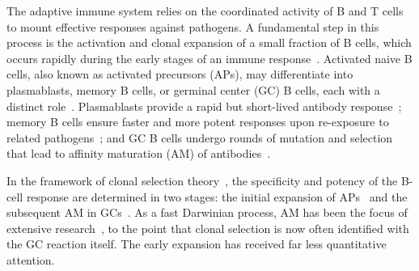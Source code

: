 \documentclass[aps, pre, twocolumn, 10pt, groupedaddress, superscriptaddress, linenumbers]{revtex4-2}
\begin{document}

\vspace{1cm}



{\Huge T}he adaptive immune system relies on the coordinated activity of B and T cells to mount effective responses against pathogens.
A fundamental step in this process is the activation and clonal expansion of a small fraction of B cells, which occurs rapidly during the early stages of an immune response~\cite{Lam_2019_Bcells}.
Activated naive B cells, also known as activated precursors (APs), may differentiate into plasmablasts, memory B cells, or germinal center (GC) B cells, each with a distinct role~\cite{pape_different_2011, Lam_2019_Bcells}.
Plasmablasts provide a rapid but short-lived antibody response~\cite{Lam_2019_Bcells}; memory B cells ensure faster and more potent responses upon re-exposure to related pathogens~\cite{Inoue_2024_Memory_review}; and GC B cells undergo rounds of mutation and selection that lead to affinity maturation (AM) of antibodies~\cite{Eisen_2014_AM, Victora_2022_GC}.

In the framework of clonal selection theory~\cite{Burnet_1957_Abs_theory, rajewskyClonalSelectionLearning1996}, the specificity and potency of the B-cell response are determined in two stages: the initial expansion of APs~\cite{pereira_finding_2010} and the subsequent AM in GCs~\cite{Victora_2022_GC}.
As a fast Darwinian process, AM has been the focus of extensive research~\cite{Perelson_1997_Review, AltanBonnet_2020_Review, Victora_2022_GC}, to the point that clonal selection is now often identified with the GC reaction itself.
The early expansion has received far less quantitative attention.
\end{document}
